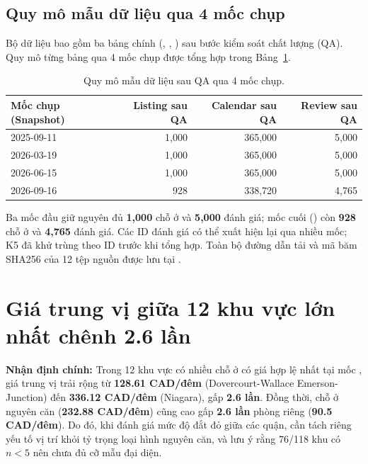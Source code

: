 \subsection{Quy mô mẫu dữ liệu qua 4 mốc chụp}

Bộ dữ liệu bao gồm ba bảng chính (, , ) sau bước kiểm soát chất lượng (QA). Quy mô từng bảng qua 4 mốc chụp được tổng hợp trong Bảng~\ref{tab:sample_size}.

\begin{table}[htbp]
  \centering
  \begin{tabular}{lrrr}
    \toprule
    \textbf{Mốc chụp (Snapshot)} & \textbf{Listing sau QA} & \textbf{Calendar sau QA} & \textbf{Review sau QA} \\
    \midrule
    2025-09-11 & 1,000 & 365,000 & 5,000 \\
    2026-03-19 & 1,000 & 365,000 & 5,000 \\
    2026-06-15 & 1,000 & 365,000 & 5,000 \\
    2026-09-16 & 928   & 338,720 & 4,765 \\
    \bottomrule
  \end{tabular}
  \caption{Quy mô mẫu dữ liệu sau QA qua 4 mốc chụp.}
  \label{tab:sample_size}
\end{table}

Ba mốc đầu giữ nguyên đủ \textbf{1,000} chỗ ở và \textbf{5,000} đánh giá; mốc cuối () còn \textbf{928} chỗ ở và \textbf{4,765} đánh giá. Các ID đánh giá có thể xuất hiện lại qua nhiều mốc; K5 đã khử trùng theo ID trước khi tổng hợp. Toàn bộ đường dẫn tải và mã băm SHA256 của 12 tệp nguồn được lưu tại .

\FloatBarrier
\section{Giá trung vị giữa 12 khu vực lớn nhất chênh 2.6 lần}

\textbf{Nhận định chính:} Trong 12 khu vực có nhiều chỗ ở có giá hợp lệ nhất tại mốc , giá trung vị trải rộng từ \textbf{128.61 CAD/đêm} (Dovercourt-Wallace Emerson-Junction) đến \textbf{336.12 CAD/đêm} (Niagara), gấp \textbf{2.6 lần}. Đồng thời, chỗ ở nguyên căn (\textbf{232.88 CAD/đêm}) cũng cao gấp \textbf{2.6 lần} phòng riêng (\textbf{90.5 CAD/đêm}). Do đó, khi đánh giá mức độ đắt đỏ giữa các quận, cần tách riêng yếu tố vị trí khỏi tỷ trọng loại hình nguyên căn, và lưu ý rằng 76/118 khu có $n < 5$ nên chưa đủ cỡ mẫu đại diện.

